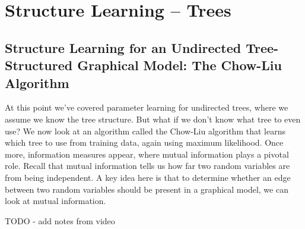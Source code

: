 
\graphicspath{ {images/slt/} }

\section{Structure Learning -- Trees}

\subsection{Structure Learning for an Undirected Tree-Structured Graphical Model: The Chow-Liu Algorithm}

At this point we've covered parameter learning for undirected trees, where we assume we know the tree structure. But what if we don't know what tree to even use? We now look at an algorithm called the Chow-Liu algorithm that learns which tree to use from training data, again using maximum likelihood. Once more, information measures appear, where mutual information plays a pivotal role. Recall that mutual information tells us how far two random variables are from being independent. A key idea here is that to determine whether an edge between two random variables should be present in a graphical model, we can look at mutual information.

TODO - add notes from video

